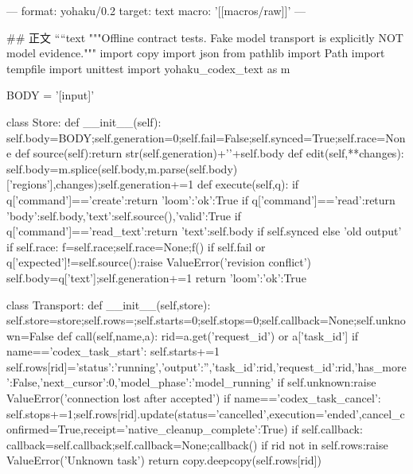 ---
format: yohaku/0.2
target: text
macro: '[[macros/raw]]'
---

## 正文
````text
"""Offline contract tests. Fake model transport is explicitly NOT model evidence."""
import copy
import json
from pathlib import Path
import tempfile
import unittest
import yohaku_codex_text as m

BODY = '[input]\nhello\n[/input]\n\n[control]\ndraft\n[/control]\n\n[result]\n{}\n[/result]\n'

class Store:
    def __init__(self):
        self.body=BODY;self.generation=0;self.fail=False;self.synced=True;self.race=None
    def source(self):return str(self.generation)+'\n'+self.body
    def edit(self,**changes):
        self.body=m.splice(self.body,m.parse(self.body)['regions'],changes);self.generation+=1
    def execute(self,q):
        if q['command']=='create':return {'loom':{'ok':True}}
        if q['command']=='read':return {'body':self.body,'text':self.source(),'valid':True}
        if q['command']=='read_text':return {'text':self.body if self.synced else 'old output'}
        if self.race:
            f=self.race;self.race=None;f()
        if self.fail or q['expected']!=self.source():raise ValueError('revision conflict')
        self.body=q['text'];self.generation+=1
        return {'loom':{'ok':True}}

class Transport:
    def __init__(self,store):
        self.store=store;self.rows={};self.starts=0;self.stops=0;self.callback=None;self.unknown=False
    def call(self,name,a):
        rid=a.get('request_id') or a['task_id']
        if name=='codex_task_start':
            self.starts+=1
            self.rows[rid]={'status':'running','output':'','task_id':rid,'request_id':rid,'has_more':False,'next_cursor':0,'model_phase':'model_running'}
            if self.unknown:raise ValueError('connection lost after accepted')
        if name=='codex_task_cancel':
            self.stops+=1;self.rows[rid].update(status='cancelled',execution='ended',cancel_confirmed=True,receipt={'native_cleanup_complete':True})
        if self.callback:
            callback=self.callback;self.callback=None;callback()
        if rid not in self.rows:raise ValueError('Unknown task')
        return copy.deepcopy(self.rows[rid])

